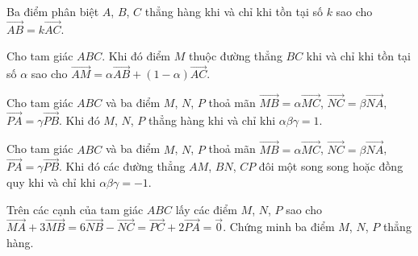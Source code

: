 \begin{dl}
Ba điểm phân biệt $A$, $B$, $C$ thẳng hàng khi và chỉ khi tồn tại số $k$ sao cho $\vec{AB}=k\vec{AC}$.
\end{dl}

\begin{dl}
Cho tam giác $ABC$. Khi đó điểm $M$ thuộc đường thẳng $BC$ khi và chỉ khi tồn tại số $\alpha$ sao cho $\vec{AM}=\alpha\vec{AB}+(1-\alpha)\vec{AC}$.
\end{dl}

\begin{dl}
Cho tam giác $ABC$ và ba điểm $M$, $N$, $P$ thoả mãn $\vec{MB}=\alpha \vec{MC}$, $\vec{NC}=\beta \vec{NA}$, $\vec{PA}=\gamma \vec{PB}$. Khi đó $M$, $N$, $P$ thẳng hàng khi và chỉ khi $\alpha \beta \gamma =1$.
\end{dl}

\begin{dl}
Cho tam giác $ABC$ và ba điểm $M$, $N$, $P$ thoả mãn $\vec{MB}=\alpha \vec{MC}$, $\vec{NC}=\beta \vec{NA}$, $\vec{PA}=\gamma \vec{PB}$. Khi đó các đường thẳng $AM$, $BN$, $CP$ đôi một song song hoặc đồng quy khi và chỉ khi $\alpha \beta \gamma =-1$.
\end{dl}

\begin{vd}%
Trên các cạnh của tam giác $ABC$ lấy các điểm $M$, $N$, $P$ sao cho $\vec{MA}+3\vec{MB}=6\vec{NB}-\vec{NC}=\vec{PC}+2\vec{PA}=\vec{0}$. Chứng minh ba điểm $M$, $N$, $P$ thẳng hàng.
\end{vd}


